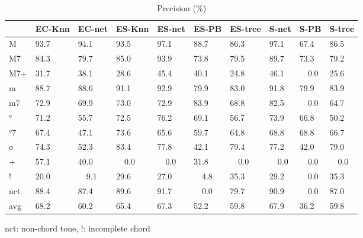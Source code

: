 \documentclass{article}
\begin{document}
\begin{table}
  \centering
  \begin{tabular}{l|p{.5cm}p{.5cm}p{.5cm}p{.5cm}p{.5cm}p{.5cm}p{.5cm}p{.5cm}p{.5cm}}
   & EC-Knn&EC-net&ES-Knn&ES-net&ES-PB&ES-tree&S-net &S-PB &S-tree \\
\hline                                               
M  & 93.7  &94.1  &93.5  &97.1  &88.7 &86.3   &97.1  & 67.4&86.5   \\
M7 & 84.3  &79.7  &85.0  &93.9  &73.8 &79.5   &89.7  & 73.3&79.2   \\
M7+& 31.7  &38.1  &28.6  &45.4  &40.1 &24.8   &46.1  &~~0.0&25.6   \\
m  & 88.7  &88.6  &91.1  &92.9  &79.9 &83.0   &91.8  & 79.9&83.9   \\
m7 & 72.9  &69.9  &73.0  &72.9  &83.9 &68.8   &82.5  &~~0.0&64.7   \\
°  & 71.2  &55.7  &72.5  &76.2  &69.1 &56.7   &73.9  & 66.8&50.2   \\
°7 & 67.4  &47.1  &73.6  &65.6  &59.7 &64.8   &68.8  & 68.8&66.7   \\
ø  & 74.3  &52.3  &83.4  &77.8  &42.1 &79.4   &77.2  & 42.0&79.0   \\
+  & 57.1  &40.0  &~~0.0 &~~0.0 &31.8 &~~0.0  &~~0.0 &~~0.0&~~0.0  \\
!  & 20.0  &~~9.1 &29.6  &27.0  &~~4.8&35.3   &29.2  &~~0.0&35.3   \\
nct& 88.4  &87.4  &89.6  &91.7  &~~0.0&79.7   &90.9  &~~0.0&87.0   \\
avg& 68.2  &60.2  &65.4  &67.3  &52.2 &59.8   &67.9  &36.2&59.8   \\

  \end{tabular}

\medskip

nct: non-chord tone, !: incomplete chord

  \caption{Precision (\%)}
  \label{tab:precision}
\end{table}
\end{document}
